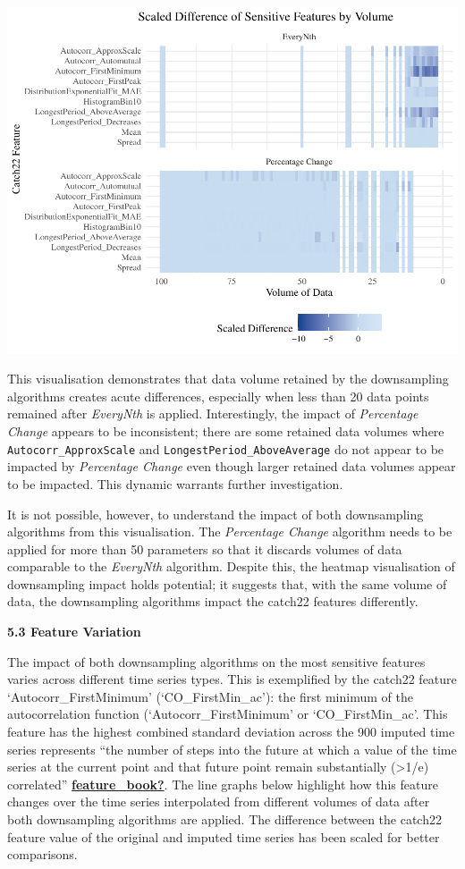 \documentclass{article}
\begin{document}
\includegraphics{210431461_CSC8639_Dissertation_files/figure-latex/Heatmap_vol-1.pdf}

This visualisation demonstrates that data volume retained by the
downsampling algorithms creates acute differences, especially when less
than 20 data points remained after \emph{EveryNth} is applied.
Interestingly, the impact of \emph{Percentage Change} appears to be
inconsistent; there are some retained data volumes where
\texttt{Autocorr\_ApproxScale} and \texttt{LongestPeriod\_AboveAverage}
do not appear to be impacted by \emph{Percentage Change} even though
larger retained data volumes appear to be impacted. This dynamic
warrants further investigation.

It is not possible, however, to understand the impact of both
downsampling algorithms from this visualisation. The \emph{Percentage
Change} algorithm needs to be applied for more than 50 parameters so
that it discards volumes of data comparable to the \emph{EveryNth}
algorithm. Despite this, the heatmap visualisation of downsampling
impact holds potential; it suggests that, with the same volume of data,
the downsampling algorithms impact the catch22 features differently.

\textbf{5.3 Feature Variation}

The impact of both downsampling algorithms on the most sensitive
features varies across different time series types. This is exemplified
by the catch22 feature `Autocorr\_FirstMinimum' (`CO\_FirstMin\_ac'):
the first minimum of the autocorrelation function
(`Autocorr\_FirstMinimum' or `CO\_FirstMin\_ac'. This feature has the
highest combined standard deviation across the 900 imputed time series
represents ``the number of steps into the future at which a value of the
time series at the current point and that future point remain
substantially (\textgreater1/e) correlated''
\protect\hyperlink{ref-feature_book}{\textbf{feature\_book?}}. The line
graphs below highlight how this feature changes over the time series
interpolated from different volumes of data after both downsampling
algorithms are applied. The difference between the catch22 feature value
of the original and imputed time series has been scaled for better
comparisons.
\end{document}

